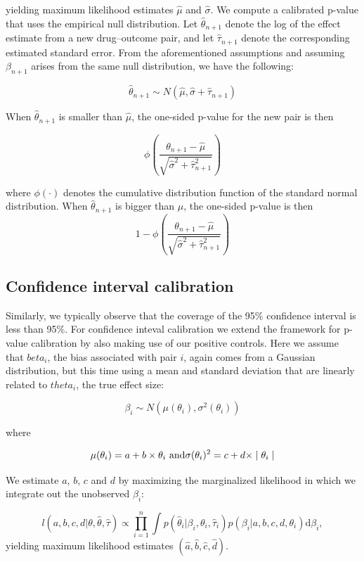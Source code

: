 \documentclass[11pt]{book}
\begin{document}
yielding maximum likelihood estimates \(\hat{\mu}\) and
\(\hat{\sigma}\). We compute a calibrated p-value that uses the
empirical null distribution. Let \(\hat{\theta}_{n+1}\) denote the log
of the effect estimate from a new drug--outcome pair, and let
\(\hat{\tau}_{n+1}\) denote the corresponding estimated standard error.
From the aforementioned assumptions and assuming \(\beta_{n+1}\) arises
from the same null distribution, we have the following:

\[\hat{\theta}_{n+1} \sim N(\hat{\mu}, \hat{\sigma} + \hat{\tau}_{n+1})\]

When \(\hat{\theta}_{n+1}\) is smaller than \(\hat{\mu}\), the one-sided
p-value for the new pair is then

\[\phi\left(\frac{\theta_{n+1} - \hat{\mu}}{\sqrt{\hat{\sigma}^2 + \hat{\tau}_{n+1}^2}}\right)\]

where \(\phi(\cdot)\) denotes the cumulative distribution function of
the standard normal distribution. When \(\hat{\theta}_{n+1}\) is bigger
than \(\hat{\mu}\), the one-sided p-value is then
\[1-\phi\left(\frac{\theta_{n+1} - \hat{\mu}}{\sqrt{\hat{\sigma}^2 + \hat{\tau}_{n+1}^2}}\right)\]

\subsection{Confidence interval
calibration}\label{confidence-interval-calibration}

Similarly, we typically observe that the coverage of the 95\% confidence
interval is less than 95\%. For confidence inteval calibration
\citep{schuemie_2018} we extend the framework for p-value calibration by
also making use of our positive controls. Here we assume that
\(beta_i\), the bias associated with pair \(i\), again comes from a
Gaussian distribution, but this time using a mean and standard deviation
that are linearly related to \(theta_i\), the true effect size:

\[\beta_i \sim N(\mu(\theta_i) , \sigma^2(\theta_i))\]

where

\[\mu(\theta_i) = a + b \times \theta_i \text{ and} \\
  \sigma(\theta_i) ^2= c + d \times \mid \theta_i \mid\]

We estimate \(a\), \(b\), \(c\) and \(d\) by maximizing the marginalized
likelihood in which we integrate out the unobserved \(\beta_i\):

\[l(a,b,c,d | \theta, \hat{\theta}, \hat{\tau} ) \propto \prod_{i=1}^{n}\int p(\hat{\theta}_i|\beta_i, \theta_i, \hat{\tau}_i)p(\beta_i|a,b,c,d,\theta_i) \text{d}\beta_i ,\]
yielding maximum likelihood estimates
\((\hat{a}, \hat{b}, \hat{c}, \hat{d})\).
\end{document}

